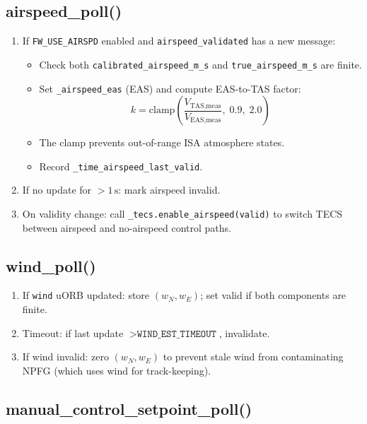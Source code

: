\documentclass[12pt,a4paper]{article}
\begin{document}
\subsection{airspeed\_poll()}

\begin{enumerate}
  \item If \texttt{FW\_USE\_AIRSPD} enabled and \texttt{airspeed\_validated}
        has a new message:
        \begin{itemize}
          \item Check both \texttt{calibrated\_airspeed\_m\_s} and
                \texttt{true\_airspeed\_m\_s} are finite.
          \item Set \texttt{\_airspeed\_eas} (EAS) and compute
                EAS-to-TAS factor:
                \begin{equation}
                  k = \text{clamp}\!\left(
                    \frac{V_{\text{TAS,meas}}}{V_{\text{EAS,meas}}},\;0.9,\;2.0
                  \right)
                \end{equation}
          \item The clamp prevents out-of-range ISA atmosphere states.
          \item Record \texttt{\_time\_airspeed\_last\_valid}.
        \end{itemize}
  \item If no update for $> 1\,\text{s}$: mark airspeed invalid.
  \item On validity change: call \texttt{\_tecs.enable\_airspeed(valid)}
        to switch TECS between airspeed and no-airspeed control paths.
\end{enumerate}

\subsection{wind\_poll()}

\begin{enumerate}
  \item If \texttt{wind} uORB updated: store $(w_N, w_E)$; set valid if
        both components are finite.
  \item Timeout: if last update $> \texttt{WIND\_EST\_TIMEOUT}$, invalidate.
  \item If wind invalid: zero $(w_N, w_E)$ to prevent stale wind from
        contaminating NPFG (which uses wind for track-keeping).
\end{enumerate}

\subsection{manual\_control\_setpoint\_poll()}
\end{document}
